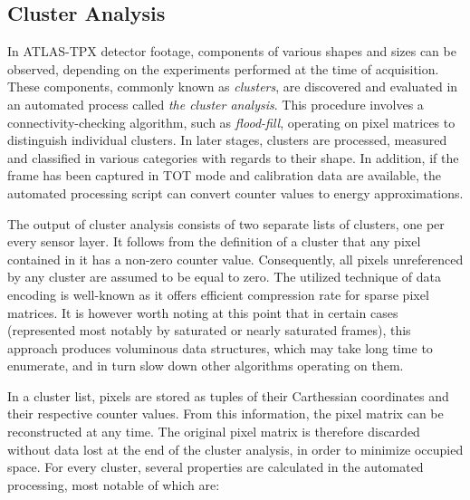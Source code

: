 \subsection{Cluster Analysis}
In ATLAS-TPX detector footage, components of various shapes and sizes can be observed, depending on the experiments performed at the time of acquisition. These components, commonly known as \textit{clusters}, are discovered and evaluated in an automated process called \textit{the cluster analysis}. This procedure involves a connectivity-checking algorithm, such as \textit{flood-fill}, operating on pixel matrices to distinguish individual clusters. In later stages, clusters are processed, measured and classified in various categories with regards to their shape. In addition, if the frame has been captured in TOT mode and calibration data are available, the automated processing script can convert counter values to energy approximations.


The output of cluster analysis consists of two separate lists of clusters, one per every sensor layer. It follows from the definition of a cluster that any pixel contained in it has a non-zero counter value. Consequently, all pixels unreferenced by any cluster are assumed to be equal to zero. The utilized technique of data encoding is well-known as it offers efficient compression rate for sparse pixel matrices. It is however worth noting at this point that in certain cases (represented most notably by saturated or nearly saturated frames), this approach produces voluminous data structures, which may take long time to enumerate, and in turn slow down other algorithms operating on them.

In a cluster list, pixels are stored as tuples of their Carthessian coordinates and their respective counter values. From this information, the pixel matrix can be reconstructed at any time. The original pixel matrix is therefore discarded without data lost at the end of the cluster analysis, in order to minimize occupied space. For every cluster, several properties are calculated in the automated processing, most notable of which are:


